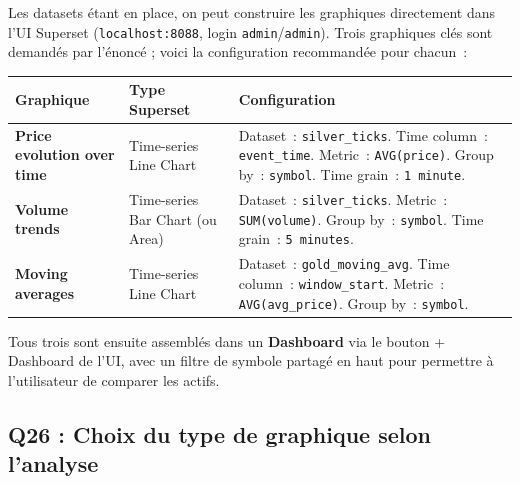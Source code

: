 \documentclass{RapportINPTCLOUD}
\begin{document}
Les datasets \'{e}tant en place, on peut construire les graphiques directement dans l'UI Superset (\texttt{localhost:8088}, login \texttt{admin}/\texttt{admin}). Trois graphiques cl\'{e}s sont demand\'{e}s par l'\'{e}nonc\'{e} ; voici la configuration recommand\'{e}e pour chacun~:

\begin{center}
\begin{tabular}{|p{3.2cm}|p{4.3cm}|p{6cm}|}
\hline
\textbf{Graphique} & \textbf{Type Superset} & \textbf{Configuration} \\
\hline
\textbf{Price evolution over time} & Time-series Line Chart & Dataset~: \texttt{silver\_ticks}. Time column~: \texttt{event\_time}. Metric~: \texttt{AVG(price)}. Group by~: \texttt{symbol}. Time grain~: \texttt{1 minute}. \\
\hline
\textbf{Volume trends} & Time-series Bar Chart (ou Area) & Dataset~: \texttt{silver\_ticks}. Metric~: \texttt{SUM(volume)}. Group by~: \texttt{symbol}. Time grain~: \texttt{5 minutes}. \\
\hline
\textbf{Moving averages} & Time-series Line Chart & Dataset~: \texttt{gold\_moving\_avg}. Time column~: \texttt{window\_start}. Metric~: \texttt{AVG(avg\_price)}. Group by~: \texttt{symbol}. \\
\hline
\end{tabular}
\end{center}

Tous trois sont ensuite assembl\'{e}s dans un \textbf{Dashboard} via le bouton \og + Dashboard\fg{} de l'UI, avec un filtre de symbole partag\'{e} en haut pour permettre \`{a} l'utilisateur de comparer les actifs.

\subsection{Q26 : Choix du type de graphique selon l'analyse}
\end{document}
